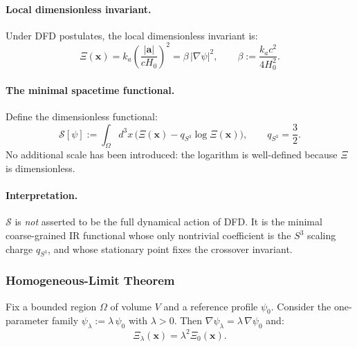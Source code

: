 \paragraph{Local dimensionless invariant.}
Under DFD postulates, the local dimensionless invariant is:
\begin{equation}
\Xi(\mathbf{x}) = k_a \left(\frac{|\mathbf{a}|}{cH_0}\right)^2 = \beta\,|\nabla\psi|^2, \qquad \beta := \frac{k_a c^2}{4H_0^2}.
\label{eq:Xi-local}
\end{equation}

\paragraph{The minimal spacetime functional.}
Define the dimensionless functional:
\begin{equation}
\boxed{
\mathcal{S}[\psi] := \int_\Omega d^3x\,\Big(\Xi(\mathbf{x}) - q_{S^3}\log\Xi(\mathbf{x})\Big), \qquad q_{S^3} = \frac{3}{2}.
}
\label{eq:spacetime-S}
\end{equation}
No additional scale has been introduced: the logarithm is well-defined because $\Xi$ is dimensionless.

\paragraph{Interpretation.}
$\mathcal{S}$ is \textit{not} asserted to be the full dynamical action of DFD. It is the minimal coarse-grained IR functional whose only nontrivial coefficient is the $S^3$ scaling charge $q_{S^3}$, and whose stationary point fixes the crossover invariant.

\subsubsection{Homogeneous-Limit Theorem}

\begin{definition}
Fix a bounded region $\Omega$ of volume $V$ and a reference profile $\psi_0$. Consider the one-parameter family $\psi_\lambda := \lambda\,\psi_0$ with $\lambda > 0$. Then $\nabla\psi_\lambda = \lambda\,\nabla\psi_0$ and:
\begin{equation}
\Xi_\lambda(\mathbf{x}) = \lambda^2 \Xi_0(\mathbf{x}).
\label{eq:Xi-scale}
\end{equation}
\end{definition}

